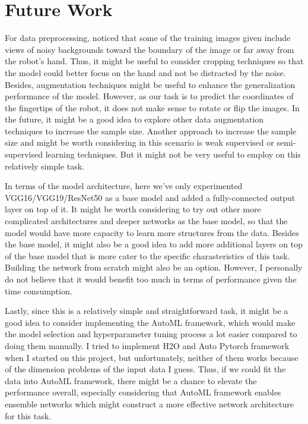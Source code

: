 \documentclass[11pt]{article}
\begin{document}
    \hypertarget{future-work}{%
\section{Future Work}\label{future-work}}

For data preprocessing, noticed that some of the training images given
include views of noisy backgrounds toward the boundary of the image or
far away from the robot's hand. Thus, it might be useful to consider
cropping techniques so that the model could better focus on the hand and
not be distracted by the noise. Besides, augmentation techniques might
be useful to enhance the generalization performance of the model.
However, as our task is to predict the coordinates of the fingertips of
the robot, it does not make sense to rotate or flip the images. In the
future, it might be a good idea to explore other data augmentation
techniques to increase the sample size. Another approach to increase the
sample size and might be worth considering in this scenario is weak
supervised or semi-supervised learning techniques. But it might not be
very useful to employ on this relatively simple task.

In terms of the model architecture, here we've only experimented
VGG16/VGG19/ResNet50 as a base model and added a fully-connected output
layer on top of it. It might be worth considering to try out other more
complicated architectures and deeper networks as the base model, so that
the model would have more capacity to learn more structures from the
data. Besides the base model, it might also be a good idea to add more
additional layers on top of the base model that is more cater to the
specific charasteristics of this task. Building the network from scratch
might also be an option. However, I personally do not believe that it
would benefit too much in terms of performance given the time
consumption.

Lastly, since this is a relatively simple and straightforward task, it
might be a good idea to consider implementing the AutoML framework,
which would make the model selection and hyperparameter tuning process a
lot easier compared to doing them manually. I tried to implement H2O and
Auto Pytorch framework when I started on this project, but
unfortunately, neither of them works because of the dimension problems
of the input data I guess. Thus, if we could fit the data into AutoML
framework, there might be a chance to elevate the performance overall,
especially considering that AutoML framework enables ensemble networks
which might construct a more effective network architecture for this
task.
\end{document}
